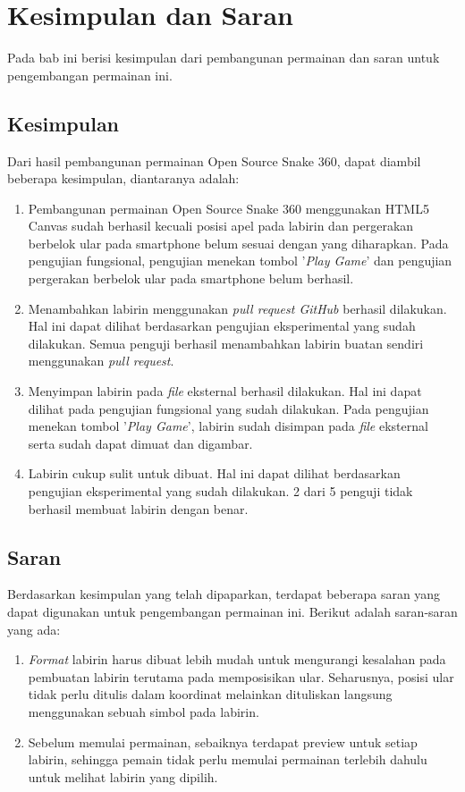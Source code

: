 \chapter{Kesimpulan dan Saran}
\label{chap:kesimpulansaran}

Pada bab ini berisi kesimpulan dari pembangunan permainan dan saran untuk pengembangan permainan ini.

\section{Kesimpulan}
Dari hasil pembangunan permainan Open Source Snake 360, dapat diambil beberapa kesimpulan, diantaranya adalah: 

\begin{enumerate}
	\item Pembangunan permainan Open Source Snake 360 menggunakan HTML5 Canvas sudah berhasil kecuali posisi apel pada labirin dan pergerakan berbelok ular pada smartphone belum sesuai dengan yang diharapkan. Pada pengujian fungsional, pengujian menekan tombol '\textit{Play Game}' dan pengujian pergerakan berbelok ular pada smartphone belum berhasil.
	\item Menambahkan labirin menggunakan \textit{pull request GitHub} berhasil dilakukan. Hal ini dapat dilihat berdasarkan pengujian eksperimental yang sudah dilakukan. Semua penguji berhasil menambahkan labirin buatan sendiri menggunakan \textit{pull request}.
	\item Menyimpan labirin pada \textit{file} eksternal berhasil dilakukan. Hal ini dapat dilihat pada pengujian fungsional yang sudah dilakukan. Pada pengujian menekan tombol '\textit{Play Game}', labirin sudah disimpan pada \textit{file} eksternal serta sudah dapat dimuat dan digambar.
	\item Labirin cukup sulit untuk dibuat. Hal ini dapat dilihat berdasarkan pengujian eksperimental yang sudah dilakukan. 2 dari 5 penguji tidak berhasil membuat labirin dengan benar.
\end{enumerate} 

\section{Saran}
Berdasarkan kesimpulan yang telah dipaparkan, terdapat beberapa saran yang dapat digunakan untuk pengembangan permainan ini. Berikut adalah saran-saran yang ada:

\begin{enumerate}
	\item \textit{Format} labirin harus dibuat lebih mudah untuk mengurangi kesalahan pada pembuatan labirin terutama pada memposisikan ular. Seharusnya, posisi ular tidak perlu ditulis dalam koordinat melainkan dituliskan langsung menggunakan sebuah simbol pada labirin.
	\item Sebelum memulai permainan, sebaiknya terdapat preview untuk setiap labirin, sehingga pemain tidak perlu memulai permainan terlebih dahulu untuk melihat labirin yang dipilih.
\end{enumerate}